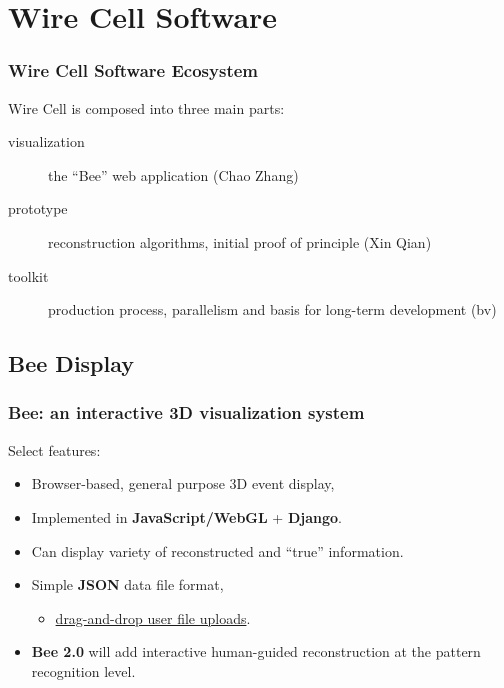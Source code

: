 \section{Wire Cell Software}

\begin{frame}
\end{frame}


\begin{frame}
  \frametitle{Wire Cell Software Ecosystem}

  Wire Cell is composed into three main parts:

  \begin{description}
  \item[visualization] the ``Bee'' web application (Chao Zhang)
  \item[prototype] reconstruction algorithms, initial proof of
    principle (Xin Qian)
  \item[toolkit] production process, parallelism and basis for long-term development (bv)
  \end{description}

\end{frame}

\subsection{Bee Display}

\begin{frame}
  \frametitle{Bee: an interactive 3D visualization system}

  Select features:
  \begin{itemize}
  \item Browser-based, general purpose 3D event display, 
  \item Implemented in \textbf{JavaScript/WebGL} + \textbf{Django}.
  \item Can display variety of reconstructed and ``true'' information.
  \item Simple \textbf{JSON} data file format, 
    \begin{itemize}
    \item \href{http://bnlif.github.io/wire-cell-docs/viz/uploads/}{drag-and-drop user
      file uploads}.
    \end{itemize}
  \item \textbf{Bee 2.0} will add interactive human-guided
    reconstruction at the pattern recognition level.
  \end{itemize}
\end{frame}

